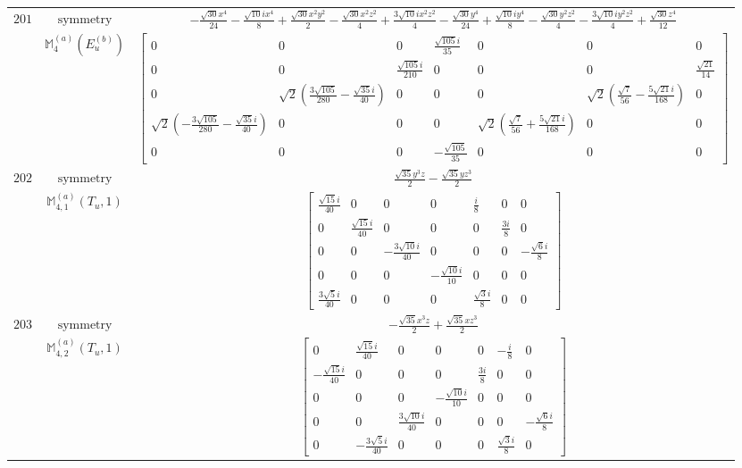 \documentclass[fleqn,8pt,landscape]{jsarticle}
\begin{document}
\begin{longtable}{ccc}
$ 201 $ & $ \text{symmetry} $ & $ - \frac{\sqrt{30} x^{4}}{24} - \frac{\sqrt{10} i x^{4}}{8} + \frac{\sqrt{30} x^{2} y^{2}}{2} - \frac{\sqrt{30} x^{2} z^{2}}{4} + \frac{3 \sqrt{10} i x^{2} z^{2}}{4} - \frac{\sqrt{30} y^{4}}{24} + \frac{\sqrt{10} i y^{4}}{8} - \frac{\sqrt{30} y^{2} z^{2}}{4} - \frac{3 \sqrt{10} i y^{2} z^{2}}{4} + \frac{\sqrt{30} z^{4}}{12} $ \\
$  $ & $ \mathbb{M}_{4}^{(a)}(E_{u}^{(b)}) $ & $ \begin{bmatrix} 0 & 0 & 0 & \frac{\sqrt{105} i}{35} & 0 & 0 & 0 \\ 0 & 0 & \frac{\sqrt{105} i}{210} & 0 & 0 & 0 & \frac{\sqrt{21}}{14} \\ 0 & \sqrt{2} \left(\frac{3 \sqrt{105}}{280} - \frac{\sqrt{35} i}{40}\right) & 0 & 0 & 0 & \sqrt{2} \left(\frac{\sqrt{7}}{56} - \frac{5 \sqrt{21} i}{168}\right) & 0 \\ \sqrt{2} \left(- \frac{3 \sqrt{105}}{280} - \frac{\sqrt{35} i}{40}\right) & 0 & 0 & 0 & \sqrt{2} \left(\frac{\sqrt{7}}{56} + \frac{5 \sqrt{21} i}{168}\right) & 0 & 0 \\ 0 & 0 & 0 & - \frac{\sqrt{105}}{35} & 0 & 0 & 0 \end{bmatrix} $ \\ \hline
$ 202 $ & $ \text{symmetry} $ & $ \frac{\sqrt{35} y^{3} z}{2} - \frac{\sqrt{35} y z^{3}}{2} $ \\
$  $ & $ \mathbb{M}_{4,1}^{(a)}(T_{u},1) $ & $ \begin{bmatrix} \frac{\sqrt{15} i}{40} & 0 & 0 & 0 & \frac{i}{8} & 0 & 0 \\ 0 & \frac{\sqrt{15} i}{40} & 0 & 0 & 0 & \frac{3 i}{8} & 0 \\ 0 & 0 & - \frac{3 \sqrt{10} i}{40} & 0 & 0 & 0 & - \frac{\sqrt{6} i}{8} \\ 0 & 0 & 0 & - \frac{\sqrt{10} i}{10} & 0 & 0 & 0 \\ \frac{3 \sqrt{5} i}{40} & 0 & 0 & 0 & \frac{\sqrt{3} i}{8} & 0 & 0 \end{bmatrix} $ \\ \hline
$ 203 $ & $ \text{symmetry} $ & $ - \frac{\sqrt{35} x^{3} z}{2} + \frac{\sqrt{35} x z^{3}}{2} $ \\
$  $ & $ \mathbb{M}_{4,2}^{(a)}(T_{u},1) $ & $ \begin{bmatrix} 0 & \frac{\sqrt{15} i}{40} & 0 & 0 & 0 & - \frac{i}{8} & 0 \\ - \frac{\sqrt{15} i}{40} & 0 & 0 & 0 & \frac{3 i}{8} & 0 & 0 \\ 0 & 0 & 0 & - \frac{\sqrt{10} i}{10} & 0 & 0 & 0 \\ 0 & 0 & \frac{3 \sqrt{10} i}{40} & 0 & 0 & 0 & - \frac{\sqrt{6} i}{8} \\ 0 & - \frac{3 \sqrt{5} i}{40} & 0 & 0 & 0 & \frac{\sqrt{3} i}{8} & 0 \end{bmatrix} $ \\ \hline

\end{longtable}
\end{document}
